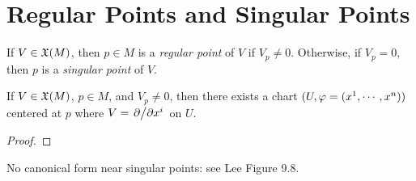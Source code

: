 \section{Regular Points and Singular Points}
If $V \in \frak{X}(M)$, then $p \in M$ is a \textit{regular point} of $V$ if $V_p \neq 0$. Otherwise, if $V_p=0$, then $p$ is a \textit{singular point} of $V$. 
\begin{theorem}\label{9.22}
    If $V \in \frak{X}(M)$, $p \in M$, and $V_p \neq 0$, then there exists a chart $(U,\varphi=(x^1,\cdots,x^n))$ centered at $p$ where $V = \pdv*{}{x^i}$ on $U$. 
\end{theorem}
\begin{proof}
    
\end{proof}
\begin{remark}
    No canonical form near singular points: see Lee Figure 9.8.
\end{remark}
